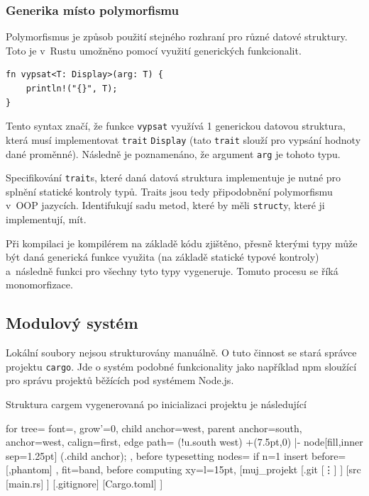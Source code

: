 \documentclass[a4paper, 12pt, twoside]{article} %
\begin{document}
		\subsubsection{Generika místo polymorfismu}
			Polymorfismus je způsob použití stejného rozhraní pro různé datové struktury. Toto je v~Rustu umožněno pomocí využití generických funkcionalit.
			\begin{verbatim}
fn vypsat<T: Display>(arg: T) {
	println!("{}", T);
}
			\end{verbatim}
			
			Tento syntax značí, že funkce \texttt{vypsat} využívá 1 generickou datovou struktura, která musí implementovat \texttt{trait} \texttt{Display} (tato \texttt{trait} slouží pro vypsání hodnoty dané proměnné). Následně je poznamenáno, že argument \texttt{arg} je tohoto typu.
			
			Specifikování \texttt{trait}s, které daná datová struktura implementuje je nutné pro splnění statické kontroly typů. Traits jsou tedy připodobnění polymorfismu v~OOP jazycích. Identifukují sadu metod, které by měli \texttt{struct}y, které ji implementují, mít.
			
			Při kompilaci je kompilérem na základě kódu zjištěno, přesně kterými typy může být daná generická funkce využita (na základě statické typové kontroly) a~následně funkci pro všechny tyto typy vygeneruje. Tomuto procesu se říká monomorfizace.

	\subsection{Modulový systém}
		Lokální soubory nejsou strukturovány manuálně. O tuto činnost se stará správce projektu \texttt{cargo}. Jde o systém podobné funkcionality jako například npm sloužící pro správu projektů běžících pod systémem Node.js.
		
		Struktura cargem vygenerovaná po inicializaci projektu je následující
		\begin{center}
			\begin{forest}
				for tree={
				font=\ttfamily,
				grow'=0,
				child anchor=west,
				parent anchor=south,
				anchor=west,
				calign=first,
				edge path={
					\noexpand{}
					(!u.south west) +(7.5pt,0) |- node[fill,inner sep=1.25pt] {} (.child anchor);
				},
				before typesetting nodes={
					if n=1
					{insert before={[,phantom]}}
					{}
				},
				fit=band,
				before computing xy={l=15pt},
				}
			[muj\_projekt
				[.git
					[\vdots]
				]
				[src
					[main.rs]
				]
				[.gitignore]
				[Cargo.toml]
			]
			\end{forest}
		\end{center}
		
\end{document}
